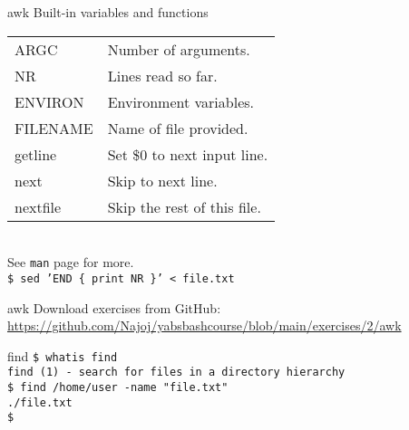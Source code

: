 \documentclass{beamer}
\let\tt\texttt
\begin{document}
\begin{frame}{awk}
        Built-in variables and functions\\
        \begin{tabular}{l|l}
                \hline
            ARGC     & Number of arguments. \\
            NR       & Lines read so far.   \\
            ENVIRON  & Environment variables. \\
            FILENAME & Name of file provided. \\
                \hline
            getline  & Set \$0 to next input line. \\
            next     & Skip to next line. \\
            nextfile & Skip the rest of this file. \\
                \hline
        \end{tabular} \\
        See \tt{man} page for more. \\
        \tt{\$ sed 'END \{ print NR \}' < file.txt} \\
\end{frame}

\begin{frame}{awk}
        Download exercises from GitHub: \\
        \url{https://github.com/Najoj/yabsbashcourse/blob/main/exercises/2/awk}
\end{frame}

\begin{frame}{find}
        \tt{\$ whatis find}\\
        \tt{find (1)  - search for files in a directory hierarchy}\\
        \tt{\$ find /home/user -name "file.txt"} \\
        \tt{./file.txt} \\
        \tt{\$ } \\
\end{frame}
\end{document}
